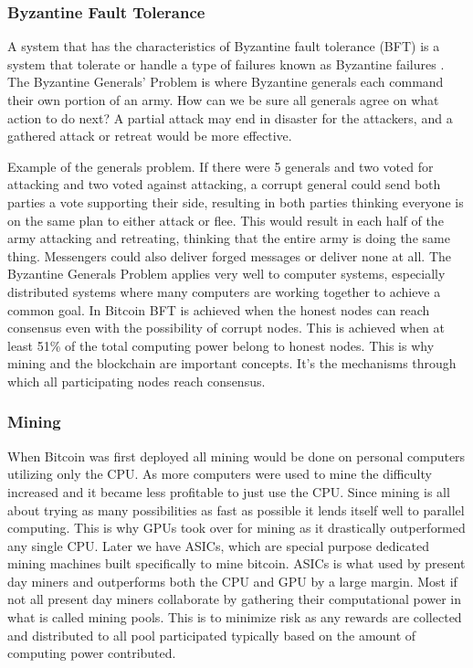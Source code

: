 \documentclass[12pt]{article}
\begin{document}
\subsubsection{Byzantine Fault Tolerance}

A system that has the characteristics of Byzantine fault tolerance (BFT) is a system that tolerate or handle a type of failures known as Byzantine failures \cite{lamport1982byzantine}. The Byzantine Generals' Problem is where Byzantine generals each command their own portion of an army. How can we be sure all generals agree on what action to do next? A partial attack may end in disaster for the attackers, and a gathered attack or retreat would be more effective.

Example of the generals problem. If there were 5 generals and two voted for attacking and two voted against attacking, a corrupt general could send both parties a vote supporting their side, resulting in both parties thinking everyone is on the same plan to either attack or flee. This would result in each half of the army attacking and retreating, thinking that the entire army is doing the same thing.  Messengers could also deliver forged messages or deliver none at all. The Byzantine Generals Problem applies very well to computer systems, especially distributed systems where many computers are working together to achieve a common goal. In Bitcoin BFT is achieved when the honest nodes can reach consensus even with the possibility of corrupt nodes. This is achieved when at least 51\% of the total computing power belong to honest nodes\cite{nakamoto2009bitcoin}\cite{tschorsch2015bitcoin}. This is why mining and the blockchain are important concepts. It's the mechanisms through which all participating nodes reach consensus.
 
\subsubsection{Mining}\label{subsubsec:mining}

When Bitcoin was first deployed all mining would be done on personal computers utilizing only the CPU. As more computers were used to mine the difficulty increased and it became less profitable to just use the CPU. Since mining is all about trying as many possibilities as fast as possible it lends itself well to parallel computing. This is why GPUs took over for mining as it drastically outperformed any single CPU. Later we have ASICs, which are special purpose dedicated mining machines built specifically to mine bitcoin. ASICs is what used by present day miners and outperforms both the CPU and GPU by a large margin. Most if not all present day miners collaborate by gathering their computational power in what is called mining pools. This is to minimize risk as any rewards are collected and distributed to all pool participated typically based on the amount of computing power contributed. 
\end{document}
